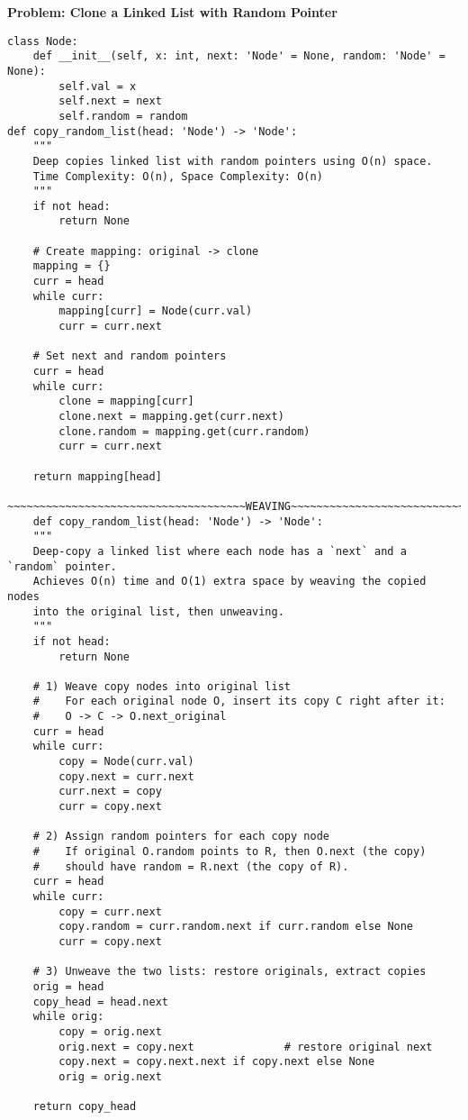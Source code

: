 \noindent\textbf{Problem: Clone a Linked List with Random Pointer}
\begin{verbatim}
class Node:
    def __init__(self, x: int, next: 'Node' = None, random: 'Node' = None):
        self.val = x
        self.next = next
        self.random = random
def copy_random_list(head: 'Node') -> 'Node':
    """
    Deep copies linked list with random pointers using O(n) space.
    Time Complexity: O(n), Space Complexity: O(n)
    """
    if not head:
        return None
    
    # Create mapping: original -> clone
    mapping = {}
    curr = head
    while curr:
        mapping[curr] = Node(curr.val)
        curr = curr.next
    
    # Set next and random pointers
    curr = head
    while curr:
        clone = mapping[curr]
        clone.next = mapping.get(curr.next)
        clone.random = mapping.get(curr.random)
        curr = curr.next
    
    return mapping[head]

~~~~~~~~~~~~~~~~~~~~~~~~~~~~~~~~~~~~~WEAVING~~~~~~~~~~~~~~~~~~~~~~~~~~~~~~~~~~~~~~
    def copy_random_list(head: 'Node') -> 'Node':
    """
    Deep-copy a linked list where each node has a `next` and a `random` pointer.
    Achieves O(n) time and O(1) extra space by weaving the copied nodes
    into the original list, then unweaving.
    """
    if not head:
        return None

    # 1) Weave copy nodes into original list
    #    For each original node O, insert its copy C right after it:
    #    O -> C -> O.next_original
    curr = head
    while curr:
        copy = Node(curr.val)
        copy.next = curr.next
        curr.next = copy
        curr = copy.next

    # 2) Assign random pointers for each copy node
    #    If original O.random points to R, then O.next (the copy)
    #    should have random = R.next (the copy of R).
    curr = head
    while curr:
        copy = curr.next
        copy.random = curr.random.next if curr.random else None
        curr = copy.next

    # 3) Unweave the two lists: restore originals, extract copies
    orig = head
    copy_head = head.next
    while orig:
        copy = orig.next
        orig.next = copy.next              # restore original next
        copy.next = copy.next.next if copy.next else None
        orig = orig.next

    return copy_head
\end{verbatim}

